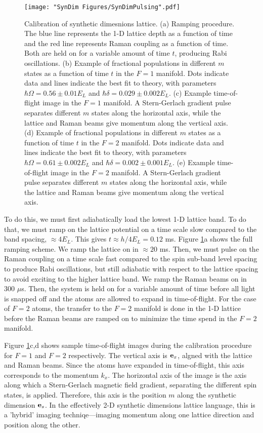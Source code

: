 \begin{figure}
	\texttt{[image: "SynDim Figures/SynDimPulsing".pdf]}
\caption{Calibration of synthetic dimesnions lattice. (a) Ramping procedure. The blue line represents the 1-D lattice depth as a function of time and the red line represents Raman coupling as a function of time. Both are held on for a variable amount of time $t$, producing Rabi oscillations. (b) Example of fractional populations in different $m$ states as a function of time $t$ in the $F=1$ manifold. Dots indicate data and lines indicate the best fit to theory, with parameters $\hbar\Omega=0.56\pm0.01 E_L$ and $\hbar\delta = 0.029 \pm 0.002 E_L$. (c) Example time-of-flight image in the $F=1$ manifold. A Stern-Gerlach gradient pulse separates different $m$ states along the horizontal axis, while the lattice and Raman beams give momentum along the vertical axis. (d)  Example of fractional populations in different $m$ states as a function of time $t$ in the $F=2$ manifold. Dots indicate data and lines indicate the best fit to theory, with parameters $\hbar\Omega=0.61\pm0.002 E_L$ and $\hbar\delta = 0.002 \pm 0.001 E_L$. (e) Example time-of-flight image in the $F=2$ manifold. A Stern-Gerlach gradient pulse separates different $m$ states along the horizontal axis, while the lattice and Raman beams give momentum along the vertical axis.  }
\label{fig:SynDimPulsing}
\end{figure}

To do this, we must first adiabatically load the lowest 1-D lattice band. To do that, we must ramp on the lattice potential on a time scale slow compared to the band spacing, $\approx 4 E_L$. This gives $t\approx h/4E_L=0.12$ ms. Figure \ref{fig:SynDimPulsing}a shows the full ramping scheme. We ramp the lattice on in $\approx 20$ ms. Then, we must pulse on the Raman coupling on a time scale fast compared to the spin sub-band level spacing to produce Rabi oscillations, but still adiabatic with respect to the lattice spacing to avoid exciting to the higher lattice band. We ramp the Raman beams on in $300$ $\mu$s. Then, the system is held on for a variable amount of time before all light is snapped off and the atoms are allowed to expand in time-of-flight. For the case of $F=2$ atoms, the transfer to the $F=2$ manifold is done in the 1-D lattice before the Raman beams are ramped on to minimize the time spend in the $F=2$ manifold. 

Figure \ref{fig:SynDimPulsing}c,d shows sample time-of-flight images during the calibration procedure for $F=1$ and $F=2$ respectively. The vertical axis is ${\bf e}_x$, algned with the lattice and Raman beams. Since the atoms have expanded in time-of-flight, this axis corresponds to the momentum $k_x$. The horizontal axis of the image is the axis along which a Stern-Gerlach magnetic field gradient, separating the different spin states, is applied. Therefore, this axis is the position $m$ along the synthetic dimension ${\bf e}_s$. In the effectively 2-D synthetic dimensions lattice language, this is a 'hybrid' imaging techniqe---imaging momentum along one lattice direction and position along the other.  

